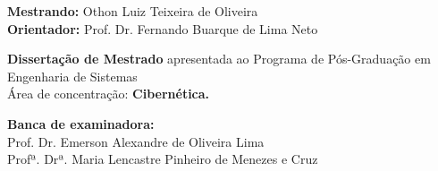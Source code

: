 \begin{center}
\begin{center}
\vspace{1ex} {\textbf{Mestrando:} Othon Luiz Teixeira de Oliveira \\
	      \textbf{Orientador:} Prof. Dr. Fernando Buarque de Lima Neto }

\end{center}


\begin{flushright}
\vspace{0.5in}
\parbox{3.15in}
 {\textbf{Dissertação de Mestrado} apresentada ao Programa de Pós-Graduação em Engenharia de Sistemas\\
 Área de concentração: \textbf{Cibernética.} }
\end{flushright}



\vspace{0.5in}

\begin{flushleft}

\vspace{1ex} \textbf{Banca de examinadora:} \\

\vspace{1ex} Prof. Dr. Emerson Alexandre de Oliveira Lima \\
Profª. Drª. Maria Lencastre Pinheiro de Menezes e Cruz \\

\end{flushleft}


\vspace{0.2in}
\dataQualif

\end{center}

